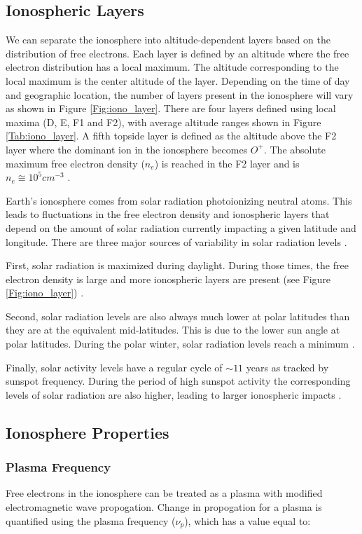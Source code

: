 \subsection{Ionospheric Layers}
We can separate the ionosphere into altitude-dependent layers based on the distribution of free electrons. Each layer is defined by an altitude where the free electron distribution has a local maximum. The altitude corresponding to the local maximum is the center altitude of the layer. Depending on the time of day and geographic location, the number of layers present in the ionosphere will vary as shown in Figure \ref{Fig:iono_layer}. There are four layers defined using local maxima (D, E, F1 and F2), with average altitude ranges shown in Figure \ref{Tab:iono_layer}. A fifth topside layer is defined as the altitude above the F2 layer where the dominant ion in the ionosphere becomes $O^+$. The absolute maximum free electron density ($n_e$) is reached in the F2 layer and is $n_e \cong 10^5 cm^{-3}$ \cite{ionospheres}. 

Earth's ionosphere comes from solar radiation photoionizing neutral atoms. This leads to fluctuations in the free electron density and ionospheric layers that depend on the amount of solar radiation currently impacting a given latitude and longitude. There are three major sources of variability in solar radiation levels \cite{ionospheres}.

First, solar radiation is maximized during daylight. During those times, the free electron density is large and more ionospheric layers are present (see Figure \ref{Fig:iono_layer}) \cite{ionospheres}. 

Second, solar radiation levels are also always much lower at polar latitudes than they are at the equivalent mid-latitudes. This is due to the lower sun angle at polar latitudes. During the polar winter, solar radiation levels reach a minimum \cite{ionospheres}. 

Finally, solar activity levels have a regular cycle of $\sim 11$ years as tracked by sunspot frequency. During the period of high sunspot activity the corresponding levels of solar radiation are also higher, leading to larger ionospheric impacts \cite{ionospheres}. 

\subsection{Ionosphere Properties}

\subsubsection{Plasma Frequency}
Free electrons in the ionosphere can be treated as a plasma with modified electromagnetic wave propogation. Change in propogation for a plasma is quantified using the plasma frequency ($\nu_p$), which has a value equal to:

